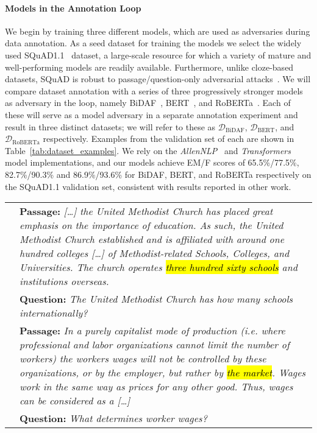 \documentclass[11pt,a4paper]{article}
\DeclareRobustCommand{\hlcustom}[1]{{\sethlcolor{mycol}\hl{#1}}}
\newcommand{\dataset}[1]{\ensuremath{\mathcal{D_{\mathrm{#1}}}}}
\newcommand{\squad}{SQuAD}
\newcommand{\squadone}{SQuAD1.1}
\begin{document}
\paragraph{Models in the Annotation Loop}{
We begin by training three different models, which are used as adversaries during data annotation.
As a seed dataset for training the models we select the widely used \squadone{}~\cite{rajpurkar2016squad} dataset, a large-scale resource for which a variety of mature and well-performing models are readily available.
Furthermore, unlike cloze-based datasets, \squad{} is robust to passage/question-only adversarial attacks~\cite{kaushik-lipton-2018-much}.
We will compare dataset annotation with a series of three progressively stronger models as adversary in the loop, namely BiDAF~\cite{Seo2016BidAF}, BERT~\cite{devlin2019bert}, and RoBERTa~\cite{liu2019roberta}. 
Each of these will serve as a model adversary in a separate annotation experiment and result in three distinct datasets; we will refer to these as \dataset{BiDAF}, \dataset{BERT}, and \dataset{RoBERTa} respectively. Examples from the validation set of each are shown in Table~\ref{tab:dataset_examples}.
We rely on the \emph{AllenNLP}~\cite{gardner-etal-2018-allennlp} and \emph{Transformers}~\cite{Wolf2019HuggingFacesTS} model implementations, and our models achieve EM/F scores of 65.5\%/77.5\%, 82.7\%/90.3\% and 86.9\%/93.6\% for BiDAF, BERT, and RoBERTa respectively on the \squadone{} validation set, consistent with results reported in other work.


\begin{table*}[!ht]
\centering \footnotesize
\begin{tabular}{p{}p{}}

 \toprule

\parbox[t]{1mm}{} &
\textbf{Passage:} \textit{[\ldots] the United Methodist Church has placed great emphasis on the importance of education. As such, the United Methodist Church established and is affiliated with around one hundred colleges [\dots] of Methodist-related Schools, Colleges, and Universities. The church operates \hlcustom{three hundred sixty schools} and institutions overseas.} \\
& \textbf{Question:} \textit{The United Methodist Church has how many schools internationally?} \\

\midrule

\parbox[t]{1mm}{} &
\textbf{Passage:} \textit{In a purely capitalist mode of production (i.e. where professional and labor organizations cannot limit the number of workers) the workers wages will not be controlled by these organizations, or by the employer, but rather by \hlcustom{the market}. Wages work in the same way as prices for any other good. Thus, wages can be considered as a [\ldots]} \\
& \textbf{Question:} \textit{What determines worker wages?} \\


\end{tabular}
\end{table*}}
\end{document}
